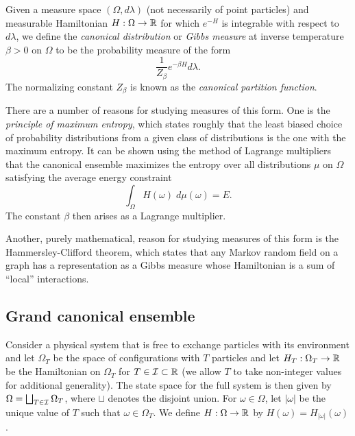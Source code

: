 Given a measure space $(\Omega, d\lambda)$ (not necessarily of point particles) and measurable
Hamiltonian $H : \Omega \rightarrow {\mathbb R}$ for which $e^{-H}$ is integrable with respect to $d\lambda$,
we define the \emph{canonical distribution} or \emph{Gibbs measure} at inverse temperature $\beta > 0$
on $\Omega$ to be the probability measure of the form
\begin{equation}
\frac{1}{Z_\beta} e^{-\beta H} d\lambda.
\end{equation}
The normalizing constant $Z_\beta$ is known as the \emph{canonical partition function}.

There are a number of reasons for studying measures of this form.
One is the \emph{principle of maximum entropy}, which states roughly that the least
biased choice of probability distributions from a given class of distributions is the
one with the maximum entropy. It can be shown using the method of Lagrange multipliers
that the canonical ensemble maximizes the
entropy over all distributions $\mu$ on $\Omega$ satisfying the average energy constraint
\begin{equation}
\int_{\Omega} H(\omega) \; d\mu(\omega) = E.
\end{equation}
The constant $\beta$ then arises as a Lagrange multiplier.

Another, purely mathematical, reason for studying measures of this form is the Hammersley-Clifford
theorem, which states that any Markov random field on a graph has a representation as a Gibbs
measure whose Hamiltonian is a sum of ``local'' interactions.



\subsection{Grand canonical ensemble}

Consider a physical system that is free to exchange particles with its environment
and let $\Omega_T$ be the space of configurations with $T$
particles and let $H_T : \Omega_T \rightarrow {\mathbb R}$ be the Hamiltonian on $\Omega_T$
for $T\in\mathcal{I}\subset{\mathbb R}$ (we allow $T$ to take non-integer values for
additional generality).
The state space for the full system is then given by $\Omega = \bigsqcup_{T \in \mathcal{I}} \Omega_T$,
where $\sqcup$ denotes the disjoint union.
For $\omega\in\Omega$, let $|\omega|$ be the unique value of $T$
such that $\omega \in \Omega_T$.
We define $H : \Omega \rightarrow {\mathbb R}$ by $H(\omega) = H_{|\omega|}(\omega)$.

